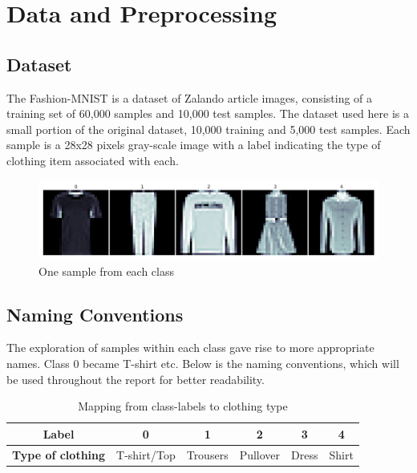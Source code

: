 \section{Data and Preprocessing}
\subsection{Dataset}
The Fashion-MNIST is a dataset of Zalando article images, consisting of a training set of 60,000 samples and 10,000 test samples.
The dataset used here is a small portion of the original dataset, 10,000 training and 5,000 test samples.
Each sample is a 28x28 pixels gray-scale image with a label indicating the type of clothing item associated with each.
\newline

\begin{figure}[ht]
\centering
\includegraphics[scale=0.45]{figures_for_report/samples_from_classes}
\captionsetup{justification=centering,margin=2cm}
\caption{One sample from each class}
\end{figure}
\subsection{Naming Conventions}
The exploration of samples within each class gave rise to more appropriate names.
Class 0 became T-shirt etc.
Below is the naming conventions, which will be used throughout the report for better readability.  \\
\begin{table}[!ht]
  \footnotesize
  \centering
\begin{tabular}{ c c c c c c }
 \toprule
 \textbf{Label} & \textbf{0} & \textbf{1} & \textbf{2} & \textbf{3} & \textbf{4} \\
 \midrule 
 \textbf{Type of clothing} & T-shirt/Top & Trousers & Pullover & Dress & Shirt \\
 \bottomrule
\end{tabular} \\[0.2cm]
\captionsetup{justification=centering,margin=2cm}
\caption{Mapping from class-labels to clothing type}
\label{features}
\end{table}



